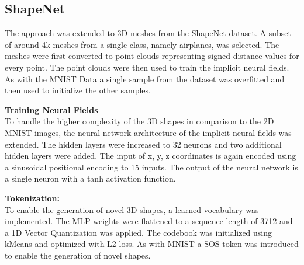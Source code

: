 \subsection*{ShapeNet}

The approach was extended to 3D meshes from the ShapeNet dataset. A subset of around 4k meshes from a single class, namely airplanes, was selected. The meshes were first converted to point clouds representing signed distance values for every point. The point clouds were then used to train the implicit neural fields. As with the MNIST Data a single sample from the dataset was overfitted and then used to initialize the other samples.
\vspace{1em}

\noindent
\textbf{Training Neural Fields}\\
To handle the higher complexity of the 3D shapes in comparison to the 2D MNIST images, the neural network architecture of the implicit neural fields was extended. The hidden layers were increased to 32 neurons and two additional hidden layers were added. The input of x, y, z coordinates is again encoded using a sinusoidal positional encoding to 15 inputs. The output of the neural network is a single neuron with a tanh activation function.




\vspace{1em}

\noindent
\textbf{Tokenization:}\\
To enable the generation of novel 3D shapes, a learned vocabulary was implemented. The MLP-weights were flattened to a sequence length of 3712 and a 1D Vector Quantization was applied. The codebook was initialized using kMeans and optimized with L2 loss. As with MNIST a SOS-token was introduced to enable the generation of novel shapes.
\vspace{1em}

